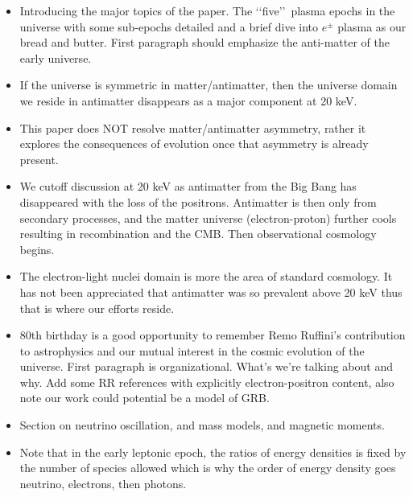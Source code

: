 \documentclass[Universe,article,submit,moreauthors,pdftex]{Definitions/mdpi}
\newcommand*{\xred}{\color{red}}
\begin{document}
\begin{itemize}
  \item {\xred Introducing the major topics of the paper. The \lq\lq five\rq\rq\ plasma epochs in the universe with some sub-epochs detailed and a brief dive into $e^{\pm}$ plasma as our bread and butter. First paragraph should emphasize the anti-matter of the early universe.}
  \item {\xred If the universe is symmetric in matter/antimatter, then the universe domain we reside in antimatter disappears as a major component at 20 keV.}
  \item {\xred This paper does NOT resolve matter/antimatter asymmetry, rather it explores the consequences of evolution once that asymmetry is already present.}
  \item {\xred We cutoff discussion at 20 keV as antimatter from the Big Bang has disappeared with the loss of the positrons. Antimatter is then only from secondary processes, and the matter universe (electron-proton) further cools resulting in recombination and the CMB. Then observational cosmology begins.}
  \item {\xred The electron-light nuclei domain is more the area of standard cosmology. It has not been appreciated that antimatter was so prevalent above 20 keV thus that is where our efforts reside.}
  \item {\xred 80th birthday is a good opportunity to remember Remo Ruffini's contribution to astrophysics and our mutual interest in the cosmic evolution of the universe. First paragraph is organizational. What's we're talking about and why. Add some RR references with explicitly electron-positron content, also note our work could potential be a model of GRB.}
  \item {\xred Section on neutrino oscillation, and mass models, and magnetic moments.}
  \item {\xred Note that in the early leptonic epoch, the ratios of energy densities is fixed by the number of species allowed which is why the order of energy density goes neutrino, electrons, then photons.}
\end{itemize}
\end{document}
